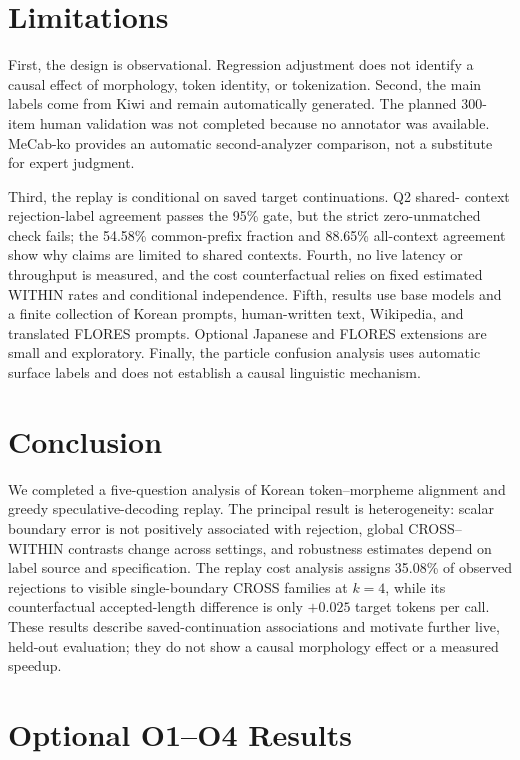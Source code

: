 \documentclass[11pt]{article}
\begin{document}
\section{Limitations}
\label{sec:limitations}

First, the design is observational. Regression adjustment does not identify
a causal effect of morphology, token identity, or tokenization. Second, the
main labels come from Kiwi and remain automatically generated. The planned
300-item human validation was not completed because no annotator was
available. MeCab-ko provides an automatic second-analyzer comparison, not a
substitute for expert judgment.

Third, the replay is conditional on saved target continuations. Q2 shared-
context rejection-label agreement passes the 95\% gate, but the strict
zero-unmatched check fails; the 54.58\% common-prefix fraction and 88.65\%
all-context agreement show why claims are limited to shared contexts. Fourth,
no live latency or throughput is measured, and the cost counterfactual relies
on fixed estimated WITHIN rates and conditional independence. Fifth, results
use base models and a finite collection of Korean prompts, human-written text,
Wikipedia, and translated FLORES prompts. Optional Japanese and FLORES
extensions are small and exploratory. Finally, the particle confusion
analysis uses automatic surface labels and does not establish a causal
linguistic mechanism.

\section{Conclusion}
\label{sec:conclusion}

We completed a five-question analysis of Korean token--morpheme alignment and
greedy speculative-decoding replay. The principal result is heterogeneity:
scalar boundary error is not positively associated with rejection, global
CROSS--WITHIN contrasts change across settings, and robustness estimates
depend on label source and specification. The replay cost analysis assigns
35.08\% of observed rejections to visible single-boundary CROSS families at
$k=4$, while its counterfactual accepted-length difference is only
$+0.025$ target tokens per call. These results describe saved-continuation
associations and motivate further live, held-out evaluation; they do not
show a causal morphology effect or a measured speedup.

\appendix
\section{Optional O1--O4 Results}
\label{app:optional}
\end{document}
